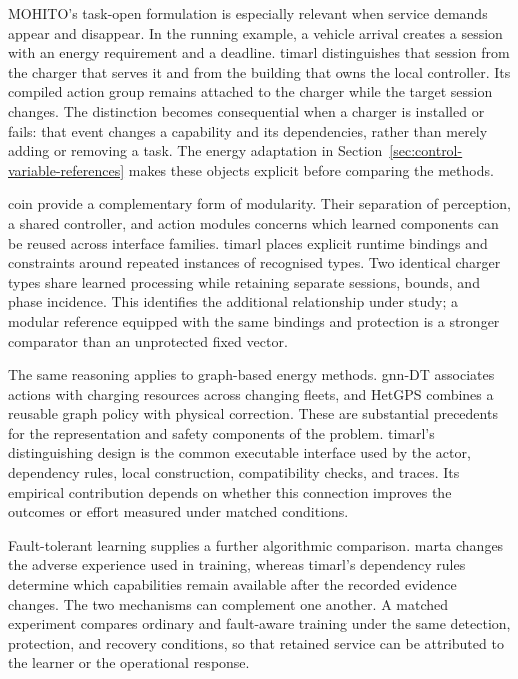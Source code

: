 MOHITO's task-open formulation is especially relevant when service demands appear and disappear. In the running example, a vehicle arrival creates a session with an energy requirement and a deadline. \gls{timarl} distinguishes that session from the charger that serves it and from the building that owns the local controller. Its compiled action group remains attached to the charger while the target session changes. The distinction becomes consequential when a charger is installed or fails: that event changes a capability and its dependencies, rather than merely adding or removing a task. The energy adaptation in Section~\ref{sec:control-variable-references} makes these objects explicit before comparing the methods.

\gls{coin} provide a complementary form of modularity. Their separation of perception, a shared controller, and action modules concerns which learned components can be reused across interface families. \gls{timarl} places explicit runtime bindings and constraints around repeated instances of recognised types. Two identical charger types share learned processing while retaining separate sessions, bounds, and phase incidence. This identifies the additional relationship under study; a modular reference equipped with the same bindings and protection is a stronger comparator than an unprotected fixed vector.

The same reasoning applies to graph-based energy methods. \gls{gnn}-DT associates actions with charging resources across changing fleets, and HetGPS combines a reusable graph policy with physical correction. These are substantial precedents for the representation and safety components of the problem. \gls{timarl}'s distinguishing design is the common executable interface used by the actor, dependency rules, local construction, compatibility checks, and traces. Its empirical contribution depends on whether this connection improves the outcomes or effort measured under matched conditions.

Fault-tolerant learning supplies a further algorithmic comparison. \gls{marta} changes the adverse experience used in training, whereas \gls{timarl}'s dependency rules determine which capabilities remain available after the recorded evidence changes. The two mechanisms can complement one another. A matched experiment compares ordinary and fault-aware training under the same detection, protection, and recovery conditions, so that retained service can be attributed to the learner or the operational response.

